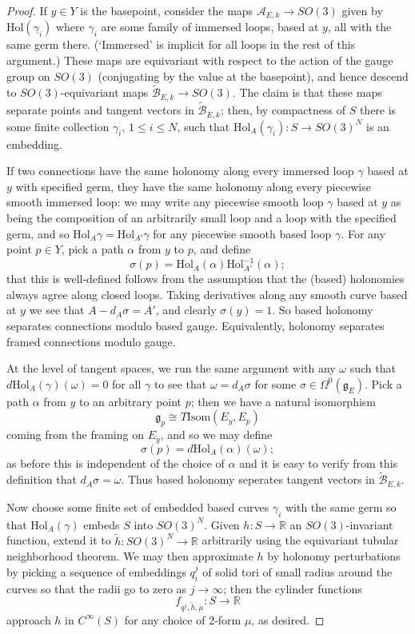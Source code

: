 \documentclass[10pt,a4paper]{amsart}
\theoremstyle{definition}
\theoremstyle{remark}
\numberwithin{figure}{qchap}
\begin{document}
\begin{proof}
If $y \in Y$ is the basepoint, consider the maps $\mathcal A_{E,k} \to SO(3)$ given by $\text{Hol}(\gamma_i)$ where $\gamma_i$ are some family of immersed loops, based at $y$, all with the same germ there. (`Immersed' is implicit for all loops in the rest of this argument.) These maps are equivariant with respect to the action of the gauge group on $SO(3)$ (conjugating by the value at the basepoint), and hence descend to $SO(3)$-equivariant maps $\widetilde{\mathcal B}_{E,k} \to SO(3)$. The claim is that these maps separate points and tangent vectors in $\widetilde{\mathcal B}_{E,k}$; then, by compactness of $S$ there is some finite collection $\gamma_i$, $1 \leq i \leq N$, such that $\text{Hol}_A(\gamma_i): S \to SO(3)^N$ is an embedding.

If two connections have the same holonomy along every immersed loop $\gamma$ based at $y$ with specified germ, they have the same holonomy along every piecewise smooth immersed loop: we may write any piecewise smooth loop $\gamma$ based at $y$ as being the composition of an arbitrarily small loop and a loop with the specified germ, and so $\text{Hol}_A \gamma = \text{Hol}_{A'} \gamma$ for any piecewise smooth based loop $\gamma$. For any point $p \in Y$, pick a path $\alpha$ from $y$ to $p$, and define 
$$\sigma(p) = \text{Hol}_{A}(\alpha) \text{Hol}_{A'}^{-1}(\alpha);$$ 
that this is well-defined follows from the assumption that the (based) holonomies always agree along closed loops. Taking derivatives along any smooth curve based at $y$ we see that $A - d_A \sigma = A'$, and clearly $\sigma(y) = 1$. So based holonomy separates connections modulo based gauge. Equivalently, holonomy separates framed connections modulo gauge.

At the level of tangent spaces, we run the same argument with any $\omega$ such that $d\text{Hol}_A (\gamma)(\omega) = 0$ for all $\gamma$ to see that $\omega = d_A \sigma$ for some $\sigma \in \Omega^0(\mathfrak g_E)$. Pick a path $\alpha$ from $y$ to an arbitrary point $p$; then we have a natural isomorphism 
$$\mathfrak g_p \cong T\text{Isom}(E_y, E_p)$$
coming from the framing on $E_y$, and so we may define 
$$\sigma(p) = d\text{Hol}_A(\alpha)(\omega);$$ 
as before this is independent of the choice of $\alpha$ and it is easy to verify from this definition that $d_A \sigma = \omega$. Thus based holonomy seperates tangent vectors in $\widetilde{\mathcal B}_{E,k}$.

Now choose some finite set of embedded based curves $\gamma_i$ with the same germ so that $\text{Hol}_A(\gamma)$ embeds $S$ into $SO(3)^N$. Given $h: S \to \mathbb R$ an $SO(3)$-invariant function, extend it to $\tilde h: SO(3)^N \to \mathbb R$ arbitrarily using the equivariant tubular neighborhood theorem. We may then approximate $h$ by holonomy perturbations by picking a sequence of embeddings $q_i^j$ of solid tori of small radius around the curves so that the radii go to zero as $j \to \infty$; then the cylinder functions 
$$f_{q^j,\tilde h, \mu}: S \to \mathbb R$$ 
approach $h$ in $C^\infty(S)$ for any choice of 2-form $\mu$, as desired.


\end{proof}
\end{document}
